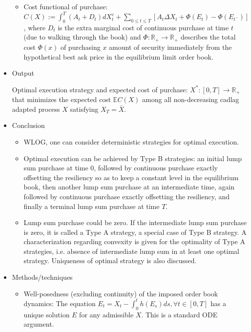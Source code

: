 \documentclass[openany,oneside]{article}
\theoremstyle{definition}
\theoremstyle{remark}
\newcommand{\E}{\mathbb{E}} %
\begin{document}
\begin{itemize}
\begin{itemize}
\item Cost functional of purchase: $C(X) := \int_0^T (A_t + D_t) d X^c_t + \sum_{0\le t\le T} [A_t \Delta X_t + \Phi(E_t) - \Phi(E_{t^-})]$, where $D_t$ is the extra marginal cost of continuous purchase at time $t$ (due to walking through the book) and $\Phi:\mathbb{R}_+ \to \mathbb{R}_+$ describes the total cost $\Phi(x)$ of purchasing $x$ amount of security immediately from the hypothetical best ask price in the equilibrium limit order book.
\end{itemize}


\item Output

Optimal execution strategy and expected cost of purchase: $X^\ast:[0,T] \to \mathbb{R}_+$ that minimizes the expected cost $\E C(X)$ among all non-decreasing cadlag adapted process $X$ satisfying $X_T = \bar{X}$.


\item Conclusion

\begin{itemize}
\item WLOG, one can consider deterministic strategies for optimal execution.

\item Optimal execution can be achieved by Type B strategies: an initial lump sum purchase at time $0$, followed by continuous purchase exactly offsetting the resiliency so as to keep a constant level in the equilibrium book, then another lump sum purchase at an intermediate time, again followed by continuous purchase exactly offsetting the resiliency, and finally a terminal lump sum purchase at time $T$.

\item Lump sum purchase could be zero. If the intermediate lump sum purchase is zero, it is called a Type A strategy, a special case of Type B strategy. A characterization regarding convexity is given for the optimality of Type A strategies, i.e. absence of intermediate lump sum in at least one optimal strategy. Uniqueness of optimal strategy is also discussed.
\end{itemize}


\item Methods/techniques
\begin{itemize}
\item Well-posedness (excluding continuity) of the imposed order book dynamics: The equation $E_t = X_t - \int_0^t h(E_s) ds, \forall t\in[0,T]$ has a unique solution $E$ for any admissible $X$. This is a standard ODE argument.


\end{itemize}
\end{itemize}
\end{document}

